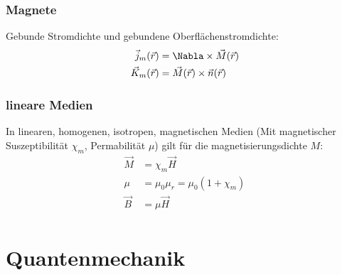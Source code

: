 \documentclass[11pt]{article}
\numberwithin{equation}{section}
\begin{document}
			\subsubsection{Magnete}
				\noindent
				Gebunde Stromdichte und gebundene Oberflächenstromdichte:
				\begin{equation}
					\begin{aligned}
						\vec{j}_m(\vec{r}) &= \Nabla\times\vec{M}(\vec{r}) \\
						\vec{K}_m(\vec{r}) &= \vec{M}(\vec{r})\times \vec{n}(\vec{r}) \\
					\end{aligned}
				\end{equation}

			\subsubsection{lineare Medien}
				\noindent
				In linearen, homogenen, isotropen, magnetischen Medien (Mit magnetischer Suszeptibilität $\chi_m$, Permabilität $\mu$) gilt für die magnetisierungsdichte $M$:
				\begin{equation}
					\begin{aligned}
						\vec{M} &= \chi_m\vec{H} \\
						\mu &= \mu_0 \mu_r = \mu_0(1+\chi_m) \\
						\vec{B} &= \mu \vec{H} \\
					\end{aligned}
				\end{equation}



	\newpage
	\section{Quantenmechanik}
\end{document}
